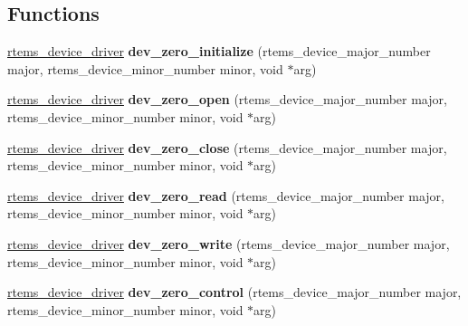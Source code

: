 \subsection*{Functions}
\begin{DoxyCompactItemize}
\item 
\mbox{\label{group__libmisc__devzero_gaa6be64f1154303a1fed79c3bbf458152}} 
\mbox{\hyperlink{group__ClassicStatus_ga545d41846817eaba6143d52ee4d9e9fe}{rtems\+\_\+device\+\_\+driver}} {\bfseries dev\+\_\+zero\+\_\+initialize} (rtems\+\_\+device\+\_\+major\+\_\+number major, rtems\+\_\+device\+\_\+minor\+\_\+number minor, void $\ast$arg)
\item 
\mbox{\label{group__libmisc__devzero_gaa0f0a1e1395320f94edf9629256d3ed5}} 
\mbox{\hyperlink{group__ClassicStatus_ga545d41846817eaba6143d52ee4d9e9fe}{rtems\+\_\+device\+\_\+driver}} {\bfseries dev\+\_\+zero\+\_\+open} (rtems\+\_\+device\+\_\+major\+\_\+number major, rtems\+\_\+device\+\_\+minor\+\_\+number minor, void $\ast$arg)
\item 
\mbox{\label{group__libmisc__devzero_gaa7dd1e840b9af01c60d73e8c6a780c80}} 
\mbox{\hyperlink{group__ClassicStatus_ga545d41846817eaba6143d52ee4d9e9fe}{rtems\+\_\+device\+\_\+driver}} {\bfseries dev\+\_\+zero\+\_\+close} (rtems\+\_\+device\+\_\+major\+\_\+number major, rtems\+\_\+device\+\_\+minor\+\_\+number minor, void $\ast$arg)
\item 
\mbox{\label{group__libmisc__devzero_gab57e2bb33571bb14b0068eb18b5aeec7}} 
\mbox{\hyperlink{group__ClassicStatus_ga545d41846817eaba6143d52ee4d9e9fe}{rtems\+\_\+device\+\_\+driver}} {\bfseries dev\+\_\+zero\+\_\+read} (rtems\+\_\+device\+\_\+major\+\_\+number major, rtems\+\_\+device\+\_\+minor\+\_\+number minor, void $\ast$arg)
\item 
\mbox{\label{group__libmisc__devzero_gad305d418b9b137361cc227dd2e88742f}} 
\mbox{\hyperlink{group__ClassicStatus_ga545d41846817eaba6143d52ee4d9e9fe}{rtems\+\_\+device\+\_\+driver}} {\bfseries dev\+\_\+zero\+\_\+write} (rtems\+\_\+device\+\_\+major\+\_\+number major, rtems\+\_\+device\+\_\+minor\+\_\+number minor, void $\ast$arg)
\item 
\mbox{\label{group__libmisc__devzero_ga60d2c37918fbf0abec3f98fb9c5ee0b2}} 
\mbox{\hyperlink{group__ClassicStatus_ga545d41846817eaba6143d52ee4d9e9fe}{rtems\+\_\+device\+\_\+driver}} {\bfseries dev\+\_\+zero\+\_\+control} (rtems\+\_\+device\+\_\+major\+\_\+number major, rtems\+\_\+device\+\_\+minor\+\_\+number minor, void $\ast$arg)
\end{DoxyCompactItemize}


